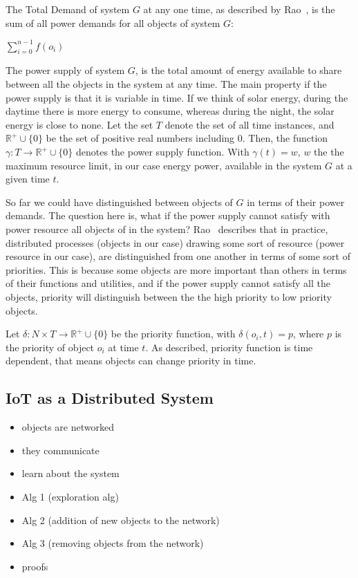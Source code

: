 \documentclass[../main/Self-Stabilization.tex]{subfiles}
\begin{document}
The Total Demand of system $G$ at any one time, as described by Rao~\cite{rao2011foundation}, is the sum of all power demands for all objects of system $G$:
\begin{center}
   $\sum\limits_{i=0}^{n-1} f(o_i)$
\end{center}

The power supply of system $G$, is the total amount of energy available to share between all the objects in the system at any time. The main property if the power supply is that it is variable in time. If we think of solar energy, during the daytime there is more energy to consume, whereas during the night, the solar energy is close to none. Let the set $T$ denote the set of all time instances, and $\mathbb{R^+}\cup\{0\}$ be the set of positive real numbers including $0$. Then, the function $\gamma:T\rightarrow\mathbb{R^+}\cup\{0\}$ denotes the power supply function. With $\gamma(t)= w$, $w$ the \cite{rao2011foundation} the maximum resource limit, in our case energy power, available in the system $G$ at a given time $t$.

So far we could have distinguished between objects of $G$ in terms of their power demands. The question here is, what if the power supply cannot satisfy with power resource all objects of in the system? Rao~\cite{rao2011foundation} describes that in practice, distributed processes (objects in our case) drawing some sort of resource (power resource in our case), are distinguished from one another in terms of some sort of priorities. This is because some objects are more important than others in terms of their functions and utilities, and if the power supply cannot satisfy all the objects, priority will distinguish between the the high priority to low priority objects.

Let $\delta:N\times T\rightarrow\mathbb{R^+}\cup\{0\}$ be the priority function, with $\delta(o_{i}, t)= p$, where $p$ is the priority of object $o_{i}$ at time $t$. As described, priority function is time dependent, that means objects can change priority in time.

\subsection{IoT as a Distributed System}
\begin{itemize}
  \item objects are networked
  \item they communicate
  \item learn about the system
  \item Alg 1 (exploration alg)
  \item Alg 2 (addition of new objects to the network)
  \item Alg 3 (removing objects from the network)
  \item proofs
\end{itemize}
\end{document}
